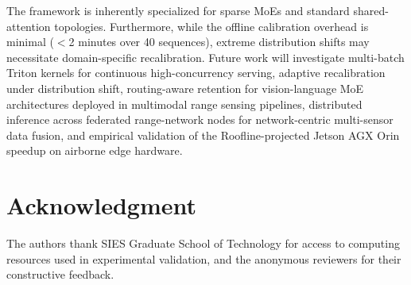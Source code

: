 \documentclass[conference]{IEEEtran}
\begin{document}
The framework is inherently specialized for sparse MoEs and standard shared-attention topologies. Furthermore, while the offline calibration overhead is minimal ($<$2 minutes over 40 sequences), extreme distribution shifts may necessitate domain-specific recalibration. Future work will investigate multi-batch Triton kernels for continuous high-concurrency serving, adaptive recalibration under distribution shift, routing-aware retention for vision-language MoE architectures deployed in multimodal range sensing pipelines, distributed inference across federated range-network nodes for network-centric multi-sensor data fusion, and empirical validation of the Roofline-projected Jetson AGX Orin speedup on airborne edge hardware.

\section*{Acknowledgment}
The authors thank SIES Graduate School of Technology for access to computing resources used in experimental validation, and the anonymous reviewers for their constructive feedback.



\end{document}
